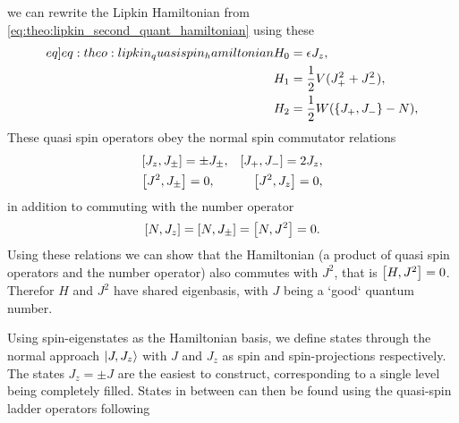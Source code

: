 we can rewrite the Lipkin Hamiltonian from \cref{eq:theo:lipkin_second_quant_hamiltonian} using these
\begin{align}
    \begin{split} \label[eq]{eq:theo:lipkin_quasispin_hamiltonian}
        H_0 &= \epsilon J_z, \\
        H_1 &= \frac{1}{2}V (J_+^2 + J_-^2), \\
        H_2 &= \frac{1}{2}W ( \set{J_+ , J_- } - N ),
    \end{split}
\end{align}
These quasi spin operators obey the normal spin commutator relations
\begin{align*}
    &\commutator{J_z}{J_\pm} = \pm J_\pm, 
    &\commutator{J_+}{J_-} = 2 J_z, \\
    &\commutator{J^2}{J_\pm} = 0,
    &\commutator{J^2}{J_z} = 0,
\end{align*}
in addition to commuting with the number operator
\begin{align*}
    \commutator{N}{J_z} = \commutator{N}{J_\pm} = \commutator{N}{J^2} = 0.
\end{align*}
Using these relations we can show that the Hamiltonian (a product of quasi spin operators and the number operator) also commutes with  $J^2$, that is $\commutator{H}{J^2}=0$. Therefor $H$ and $J^2$ have shared eigenbasis, with $J$ being a `good` quantum number.

Using spin-eigenstates as the Hamiltonian basis, we define states through the normal approach $\ket{J,J_z}$ with $J$ and $ J_z$ as spin and spin-projections respectively. The states $J_z = \pm J$ are the easiest to construct, corresponding to a single level being completely filled. States in between can then be found using the quasi-spin ladder operators following

